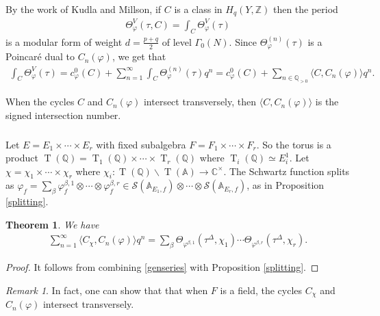 \documentclass[11pt]{article} %
\newcommand{\8}{\infty}
\newcommand{\Z}{\mathbb{Z}}
\newcommand{\Tbf}{\operatorname{T}}
\newcommand{\A}{\mathbb{A}}
\newcommand{\Q}{\mathbb{Q}}
\newcommand{\C}{\mathbb{C}}
\newcommand{\Scal}{\mathcal{S}}
\newcommand{\fin}{f}
\theoremstyle{mytheoremstyle}
\newtheorem{thm}{Theorem}[section]
\theoremstyle{remark}
\newtheorem{rmk}{Remark}[section]
\numberwithin{equation}{section}
\begin{document}
By the work of Kudla and Millson, if $C$ is a class in $H_q(Y,\Z)$ then the period
\begin{align}
    \Theta^V_\varphi(\tau,C) = \int_C \Theta^V_\varphi(\tau)
\end{align}
is a modular form of weight $d=\frac{p+q}{2}$ of level $\Gamma_0(N)$. Since $\Theta_\varphi^{(n)}(\tau)$ is a Poincaré dual to $C_n(\varphi)$, we get that
\begin{align} \label{genseries}
 \int_C \Theta^V_\varphi(\tau) =  c^0_\varphi(C) + \sum_{ n=1}^\8\int_C \Theta_\varphi^{(n)}(\tau) q^n =  c^0_\varphi(C) + \sum_{ n \in \Q_{>0}} \langle C,C_n(\varphi) \rangle q^n.
\end{align} 

When the cycles $C$ and $C_n(\varphi)$ intersect transversely, then $\langle C,C_n(\varphi) \rangle$ is the signed intersection number.

\subsubsection{} Let $E=E_1 \times \cdots \times E_r$ with fixed subalgebra $F=F_1 \times \cdots \times F_r$. So the torus is a product $\Tbf(\Q) = \Tbf_1(\Q) \times \cdots  \times \Tbf_r(\Q)$ where $\Tbf_i(\Q) \simeq E_i^1$. Let $\chi=\chi_1 \times \cdots \times \chi_r$ where $\chi_i \colon \Tbf(\Q) \backslash \Tbf(\A) \longrightarrow \C^\times$. The Schwartz function splits as $\varphi_\fin=\sum_{\beta} \varphi_{\fin}^{\beta,1} \otimes \cdots \otimes \varphi_{\fin}^{\beta,r} \in \Scal(\A_{E_1,\fin}) \otimes \cdots \otimes \Scal(\A_{E_r,\fin})$, as in Proposition \ref{splitting}. 

\begin{thm} \label{mainthmgen}  We have 
\begin{align}
    \sum_{ n =1}^\8 \langle C_\chi,C_n(\varphi) \rangle q^n = \sum_{\beta} \Theta_{\varphi^{\beta,1}}(\tau^\Delta,\chi_1) \cdots \Theta_{\varphi^{\beta,r}}(\tau^\Delta,\chi_r).
    \end{align}
\end{thm}
\begin{proof}
    It follows from combining \eqref{genseries} with Proposition \ref{splitting}.
\end{proof}
\begin{rmk}
    In fact, one can show that that when $F$ is a field, the cycles $C_\chi$ and $C_n(\varphi)$ intersect transversely.
\end{rmk}
\end{document}
